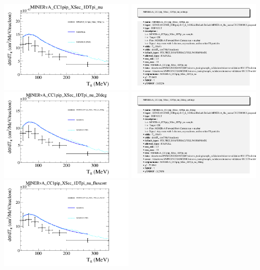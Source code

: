 \documentclass{article}
\begin{document}
\centering
\includegraphics[width=0.49\textwidth]{figures/nuisance_MINERvA_CC1pip_XSec_1DTpi_nu_comp.png}
\includegraphics[width=0.49\textwidth]{figures/nuisance_MINERvA_CC1pip_XSec_1DTpi_nu_info.png}
\centering
\includegraphics[width=0.49\textwidth]{figures/nuisance_MINERvA_CC1pip_XSec_1DTpi_nu_20deg_comp.png}
\includegraphics[width=0.49\textwidth]{figures/nuisance_MINERvA_CC1pip_XSec_1DTpi_nu_20deg_info.png}
\centering
\includegraphics[width=0.49\textwidth]{figures/nuisance_MINERvA_CC1pip_XSec_1DTpi_nu_fluxcorr_comp.png}
\end{document}
